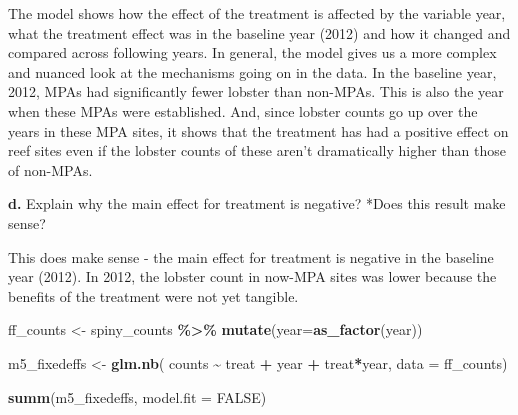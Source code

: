 \documentclass[
]{article}
\newenvironment{Shaded}{\begin{snugshade}}{\end{snugshade}}
\newcommand{\AttributeTok}[1]{\textcolor[rgb]{0.13,0.29,0.53}{#1}}
\newcommand{\ConstantTok}[1]{\textcolor[rgb]{0.56,0.35,0.01}{#1}}
\newcommand{\FunctionTok}[1]{\textcolor[rgb]{0.13,0.29,0.53}{\textbf{#1}}}
\newcommand{\NormalTok}[1]{#1}
\newcommand{\OtherTok}[1]{\textcolor[rgb]{0.56,0.35,0.01}{#1}}
\newcommand{\SpecialCharTok}[1]{\textcolor[rgb]{0.81,0.36,0.00}{\textbf{#1}}}
\begin{document}
The model shows how the effect of the treatment is affected by the
variable year, what the treatment effect was in the baseline year (2012)
and how it changed and compared across following years. In general, the
model gives us a more complex and nuanced look at the mechanisms going
on in the data. In the baseline year, 2012, MPAs had significantly fewer
lobster than non-MPAs. This is also the year when these MPAs were
established. And, since lobster counts go up over the years in these MPA
sites, it shows that the treatment has had a positive effect on reef
sites even if the lobster counts of these aren't dramatically higher
than those of non-MPAs.

\textbf{d.} Explain why the main effect for treatment is negative? *Does
this result make sense?

This does make sense - the main effect for treatment is negative in the
baseline year (2012). In 2012, the lobster count in now-MPA sites was
lower because the benefits of the treatment were not yet tangible.

\begin{Shaded}
\begin{Highlighting}[]
\NormalTok{ff\_counts }\OtherTok{\textless{}{-}}\NormalTok{ spiny\_counts }\SpecialCharTok{\%\textgreater{}\%}
    \FunctionTok{mutate}\NormalTok{(}\AttributeTok{year=}\FunctionTok{as\_factor}\NormalTok{(year))}

\NormalTok{m5\_fixedeffs }\OtherTok{\textless{}{-}} \FunctionTok{glm.nb}\NormalTok{(}
\NormalTok{    counts }\SpecialCharTok{\textasciitilde{}}
\NormalTok{        treat }\SpecialCharTok{+}
\NormalTok{        year }\SpecialCharTok{+}
\NormalTok{        treat}\SpecialCharTok{*}\NormalTok{year,}
    \AttributeTok{data =}\NormalTok{ ff\_counts)}

\FunctionTok{summ}\NormalTok{(m5\_fixedeffs, }\AttributeTok{model.fit =} \ConstantTok{FALSE}\NormalTok{)}
\end{Highlighting}
\end{Shaded}
\end{document}
